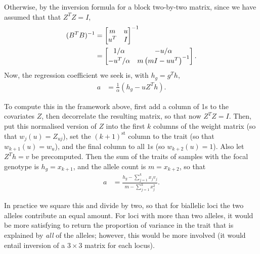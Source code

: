 \documentclass{article}
\begin{document}
Otherwise, by the inversion formula for a block two-by-two matrix,
since we have assumed that that $Z^T Z = I$,
\begin{align*}
    (B^T B)^{-1}
    &=
    \left[
        \begin{array}{@{}cc@{}}
            m & u \\
            u^T & I
        \end{array}
    \right]^{-1} \\
    &=
    \left[
        \begin{array}{@{}cc@{}}
            1/\alpha
            &
            - u / \alpha
            \\
            - u^T / \alpha
            &
            m \left(m I - u u^T \right)^{-1}
        \end{array}
    \right] .
\end{align*}
Now, the regression coefficient we seek is,
with $h_g = g^T h$,
\begin{align*}
    a
    &=
    \frac{1}{\alpha} \left(
        h_g - u Z^T h
    \right) .
\end{align*}

To compute this in the framework above,
first add a column of 1s to the covariates $Z$,
then decorrelate the resulting matrix, so that now $Z^T Z = I$.
Then, put this normalised version of $Z$
into the first $k$ columns of the weight matrix (so that $w_j(u) = Z_{uj}$),
set the $(k+1)^\text{st}$ column to the trait (so that $w_{k+1}(u) = w_u$),
and the final column to all $1$s (so $w_{k+2}(u) = 1$).
Also let $Z^T h = v$ be precomputed.
Then the sum of the traits of samples with the focal genotype is $h_g = x_{k+1}$,
and the allele count is $m = x_{k+2}$,
so that
\begin{align*}
    a
    &=
    \frac{
        h_g - \sum_{j=1}^k x_j v_j
    }{
        m - \sum_{j=1}^k x_j^2 } .
\end{align*}

In practice we square this and divide by two,
so that for biallelic loci the two alleles contribute an equal amount.
For loci with more than two alleles,
it would be more satisfying to return the proportion of variance in the trait
that is explained by \emph{all} of the alleles;
however, this would be more involved
(it would entail inversion of a $3 \times 3$ matrix for each locus).
\end{document}
